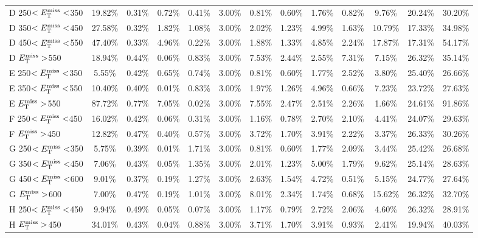 \begin{table}
\begin{tabular}{|l|ccccccccccc|c|}
 D 250$<E_\text{T}^\text{miss}<$350 & 19.82\% & 0.31\%  & 0.72\%  & 0.41\%  & 3.00\%  & 0.81\%  & 0.60\%  & 1.76\%  & 0.82\%  & 9.76\%  & 20.24\% & 30.20\% \\
 D 350$<E_\text{T}^\text{miss}<$450 & 27.58\% & 0.32\%  & 1.82\%  & 1.08\%  & 3.00\%  & 2.02\%  & 1.23\%  & 4.99\%  & 1.63\%  & 10.79\% & 17.33\% & 34.98\% \\
 D 450$<E_\text{T}^\text{miss}<$550 & 47.40\% & 0.33\%  & 4.96\%  & 0.22\%  & 3.00\%  & 1.88\%  & 1.33\%  & 4.85\%  & 2.24\%  & 17.87\% & 17.31\% & 54.17\% \\
 D $E_\text{T}^\text{miss}>$550     & 18.94\% & 0.44\%  & 0.06\%  & 0.83\%  & 3.00\%  & 7.53\%  & 2.44\%  & 2.55\%  & 7.31\%  & 7.15\%  & 26.32\% & 35.14\% \\
 E 250$<E_\text{T}^\text{miss}<$350 & 5.55\%  & 0.42\%  & 0.65\%  & 0.74\%  & 3.00\%  & 0.81\%  & 0.60\%  & 1.77\%  & 2.52\%  & 3.80\%  & 25.40\% & 26.66\% \\
 E 350$<E_\text{T}^\text{miss}<$550 & 10.40\% & 0.40\%  & 0.01\%  & 0.83\%  & 3.00\%  & 1.97\%  & 1.26\%  & 4.96\%  & 0.66\%  & 7.23\%  & 23.72\% & 27.63\% \\
 E $E_\text{T}^\text{miss}>$550     & 87.72\% & 0.77\%  & 7.05\%  & 0.02\%  & 3.00\%  & 7.55\%  & 2.47\%  & 2.51\%  & 2.26\%  & 1.66\%  & 24.61\% & 91.86\% \\
 F 250$<E_\text{T}^\text{miss}<$450 & 16.02\% & 0.42\%  & 0.06\%  & 0.31\%  & 3.00\%  & 1.16\%  & 0.78\%  & 2.70\%  & 2.10\%  & 4.41\%  & 24.07\% & 29.63\% \\
 F $E_\text{T}^\text{miss}>$450     & 12.82\% & 0.47\%  & 0.40\%  & 0.57\%  & 3.00\%  & 3.72\%  & 1.70\%  & 3.91\%  & 2.22\%  & 3.37\%  & 26.33\% & 30.26\% \\
 G 250$<E_\text{T}^\text{miss}<$350 & 5.75\%  & 0.39\%  & 0.01\%  & 1.71\%  & 3.00\%  & 0.81\%  & 0.60\%  & 1.77\%  & 2.09\%  & 3.44\%  & 25.42\% & 26.68\% \\
 G 350$<E_\text{T}^\text{miss}<$450 & 7.06\%  & 0.43\%  & 0.05\%  & 1.35\%  & 3.00\%  & 2.01\%  & 1.23\%  & 5.00\%  & 1.79\%  & 9.62\%  & 25.14\% & 28.63\% \\
 G 450$<E_\text{T}^\text{miss}<$600 & 9.01\%  & 0.37\%  & 0.19\%  & 1.27\%  & 3.00\%  & 2.63\%  & 1.54\%  & 4.72\%  & 0.51\%  & 5.15\%  & 24.77\% & 27.64\% \\
 G $E_\text{T}^\text{miss}>$600     & 7.00\%  & 0.47\%  & 0.19\%  & 1.01\%  & 3.00\%  & 8.01\%  & 2.34\%  & 1.74\%  & 0.68\%  & 15.62\% & 26.32\% & 32.70\% \\
 H 250$<E_\text{T}^\text{miss}<$450 & 9.94\%  & 0.49\%  & 0.05\%  & 0.07\%  & 3.00\%  & 1.17\%  & 0.79\%  & 2.72\%  & 2.06\%  & 4.60\%  & 26.32\% & 28.91\% \\
 H $E_\text{T}^\text{miss}>$450     & 34.01\% & 0.43\%  & 0.04\%  & 0.88\%  & 3.00\%  & 3.71\%  & 1.70\%  & 3.91\%  & 0.93\%  & 2.41\%  & 19.94\% & 40.03\% \\

\end{tabular}
\end{table}
